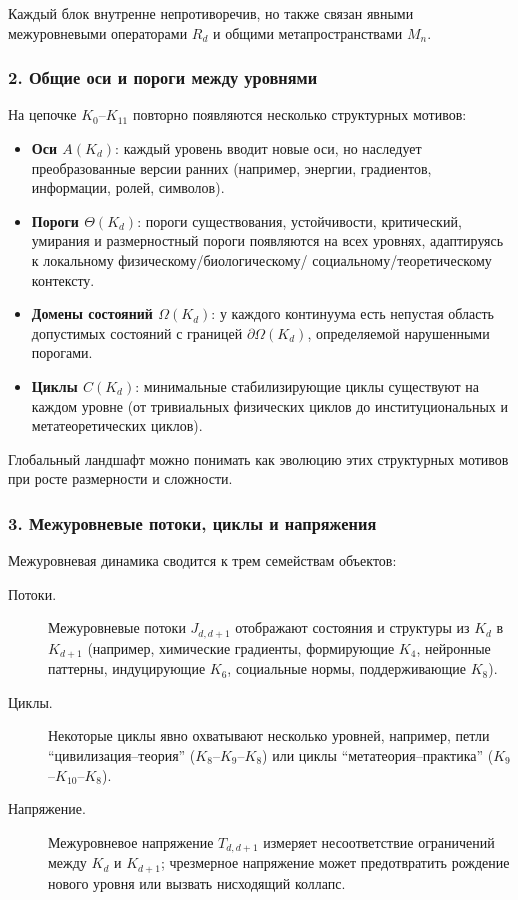 Каждый блок внутренне непротиворечив, но также связан явными межуровневыми
операторами $R_d$ и общими метапространствами $M_n$.

\subsubsection{2. Общие оси и пороги между уровнями}

На цепочке $K_0$--$K_{11}$ повторно появляются несколько структурных
мотивов:
\begin{itemize}
  \item \textbf{Оси $A(K_d)$}: каждый уровень вводит новые оси, но наследует
        преобразованные версии ранних (например, энергии, градиентов,
        информации, ролей, символов).
  \item \textbf{Пороги $\Theta(K_d)$}: пороги существования, устойчивости,
        критический, умирания и размерностный пороги появляются на всех
        уровнях, адаптируясь к локальному физическому/биологическому/
        социальному/теоретическому контексту.
  \item \textbf{Домены состояний $\Omega(K_d)$}: у каждого континуума есть
        непустая область допустимых состояний с границей
        $\partial\Omega(K_d)$, определяемой нарушенными порогами.
  \item \textbf{Циклы $C(K_d)$}: минимальные стабилизирующие циклы существуют
        на каждом уровне (от тривиальных физических циклов до институциональных
        и метатеоретических циклов).
\end{itemize}

Глобальный ландшафт можно понимать как эволюцию этих структурных мотивов при
росте размерности и сложности.

\subsubsection{3. Межуровневые потоки, циклы и напряжения}

Межуровневая динамика сводится к трем семействам объектов:
\begin{description}
  \item[Потоки.] Межуровневые потоки $J_{d,d+1}$ отображают состояния и
        структуры из $K_d$ в $K_{d+1}$ (например, химические градиенты,
        формирующие $K_4$, нейронные паттерны, индуцирующие $K_6$,
        социальные нормы, поддерживающие $K_8$).
  \item[Циклы.] Некоторые циклы явно охватывают несколько уровней, например,
        петли ``цивилизация--теория'' ($K_8$--$K_9$--$K_8$) или
        циклы ``метатеория--практика'' ($K_9$--$K_{10}$--$K_8$).
  \item[Напряжение.] Межуровневое напряжение $T_{d,d+1}$ измеряет
        несоответствие ограничений между $K_d$ и $K_{d+1}$; чрезмерное
        напряжение может предотвратить рождение нового уровня или вызвать
        нисходящий коллапс.
\end{description}

